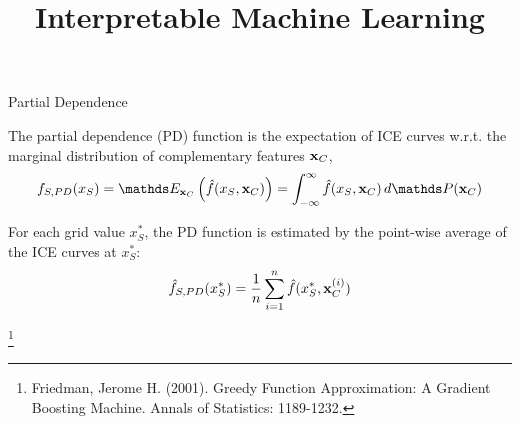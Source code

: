 \documentclass[11pt,compress,t,notes=noshow, aspectratio=169, xcolor=table]{beamer}
\title{Interpretable Machine Learning}
\date{}
\begin{document}
\newcommand{\titlefigure}{figure/pdp_bike}
\newcommand{\learninggoals}{
\item Understand PD plots and their relation to ICE plots
\item Understand how to interpret ICE curves and PD plots
}


\begin{vbframe}{Partial Dependence}

The partial dependence (PD) function is the expectation of ICE curves w.r.t. the marginal distribution of complementary features $\xv_C$,
$$f_{S, PD}(x_S) = \E_{\xv_C} \left( \fh(x_S, \xv_C) \right) = \int_{-\infty}^{\infty} \fh(x_S, \xv_C) \, d\P(\xv_C)$$

For each grid value $x_S^*$, the PD function is estimated by the point-wise average of the ICE curves at $x_S^*$:
$$\fh_{S, PD}(x_S^*) = \frac{1}{n} \sum_{i=1}^n \fh(x_S^*, \xv_C^{(i)})$$


\footnote[frame]{Friedman, Jerome H. (2001). Greedy Function Approximation: A Gradient Boosting Machine. Annals of Statistics: 1189-1232.}
\end{vbframe}


\end{document}

